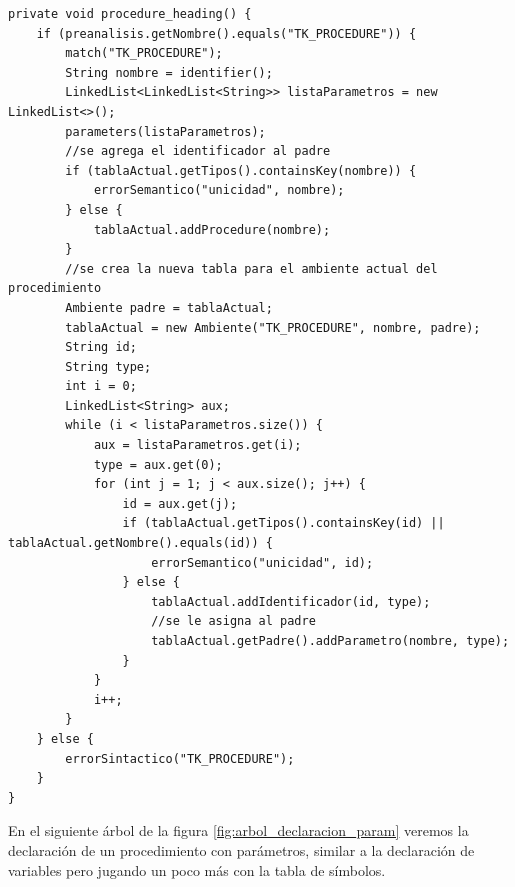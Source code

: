 \begin{verbatim}
private void procedure_heading() {
	if (preanalisis.getNombre().equals("TK_PROCEDURE")) {
		match("TK_PROCEDURE");
		String nombre = identifier();
		LinkedList<LinkedList<String>> listaParametros = new LinkedList<>();
		parameters(listaParametros);
		//se agrega el identificador al padre
		if (tablaActual.getTipos().containsKey(nombre)) {
			errorSemantico("unicidad", nombre);
		} else {
			tablaActual.addProcedure(nombre);
		}
		//se crea la nueva tabla para el ambiente actual del procedimiento
		Ambiente padre = tablaActual;
		tablaActual = new Ambiente("TK_PROCEDURE", nombre, padre);
		String id;
		String type;
		int i = 0;
		LinkedList<String> aux;
		while (i < listaParametros.size()) {
			aux = listaParametros.get(i);
			type = aux.get(0);
			for (int j = 1; j < aux.size(); j++) {
				id = aux.get(j);
				if (tablaActual.getTipos().containsKey(id) || tablaActual.getNombre().equals(id)) {
					errorSemantico("unicidad", id);
				} else {
					tablaActual.addIdentificador(id, type);
					//se le asigna al padre 
					tablaActual.getPadre().addParametro(nombre, type);
				}
			}
			i++;
		}
	} else {
		errorSintactico("TK_PROCEDURE");
	}
}
\end{verbatim}


En el siguiente árbol de la figura \ref{fig:arbol_declaracion_param} veremos la declaración de un procedimiento con parámetros, similar a la declaración de variables pero jugando un poco más con la tabla de símbolos.

